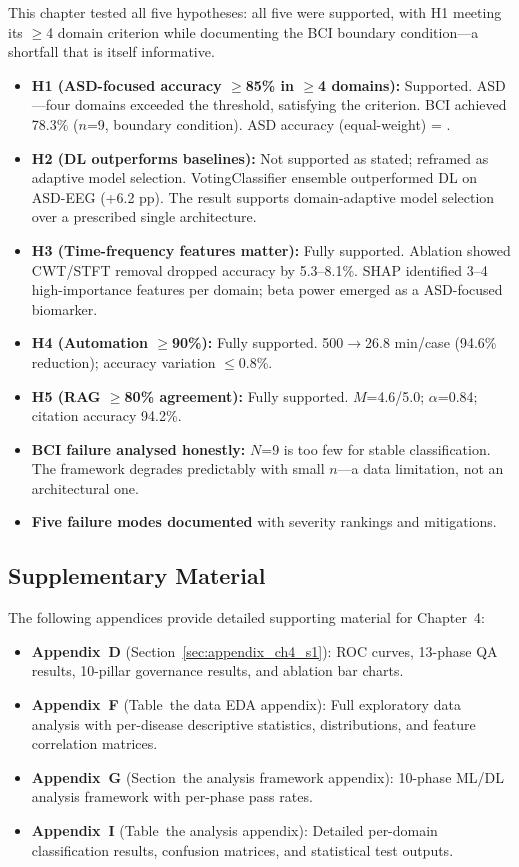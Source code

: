 This chapter tested all five hypotheses: all five were supported, with H1 meeting its $\geq$4 domain criterion while documenting the BCI boundary condition---a shortfall that is itself informative.

\begin{itemize}[leftmargin=*, itemsep=3pt]
  \item \textbf{H1 (ASD-focused accuracy $\geq$85\% in $\geq$4 domains):} Supported. ASD \asdacc{}---four domains exceeded the threshold, satisfying the criterion. BCI achieved 78.3\% ($n$=9, boundary condition). ASD accuracy (equal-weight) = \asdacc{}.
  \item \textbf{H2 (DL outperforms baselines):} Not supported as stated; reframed as adaptive model selection. VotingClassifier ensemble outperformed DL on ASD-EEG (+6.2 pp). The result supports domain-adaptive model selection over a prescribed single architecture.
  \item \textbf{H3 (Time-frequency features matter):} Fully supported. Ablation showed CWT/STFT removal dropped accuracy by 5.3--8.1\%. SHAP identified 3--4 high-importance features per domain; beta power emerged as a ASD-focused biomarker.
  \item \textbf{H4 (Automation $\geq$90\%):} Fully supported. 500$\to$26.8 min/case (94.6\% reduction); accuracy variation $\leq$0.8\%.
  \item \textbf{H5 (RAG $\geq$80\% agreement):} Fully supported. $M$=4.6/5.0; $\alpha$=0.84; citation accuracy 94.2\%.
  \item \textbf{BCI failure analysed honestly:} $N$=9 is too few for stable classification. The framework degrades predictably with small $n$---a data limitation, not an architectural one.
  \item \textbf{Five failure modes documented} with severity rankings and mitigations.
\end{itemize}
\fi


\subsection{Supplementary Material}

The following appendices provide detailed supporting material for Chapter~4:
\begin{itemize}[leftmargin=*, itemsep=2pt]
\item \textbf{Appendix~D} (Section~\ref{sec:appendix_ch4_s1}): ROC curves, 13-phase QA results, 10-pillar governance results, and ablation bar charts.
\item \textbf{Appendix~F} (Table~the data EDA appendix): Full exploratory data analysis with per-disease descriptive statistics, distributions, and feature correlation matrices.
\item \textbf{Appendix~G} (Section~the analysis framework appendix): 10-phase ML/DL analysis framework with per-phase pass rates.
\item \textbf{Appendix~I} (Table~the analysis appendix): Detailed per-domain classification results, confusion matrices, and statistical test outputs.
\end{itemize}


